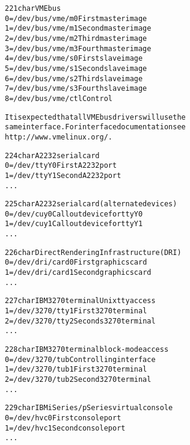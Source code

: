 \documentclass[a4paper,8pt,english]{sphinxmanual}
\begin{document}
\begin{alltt}
 221 char       VME bus
                  0 = /dev/bus/vme/m0           First master image
                  1 = /dev/bus/vme/m1           Second master image
                  2 = /dev/bus/vme/m2           Third master image
                  3 = /dev/bus/vme/m3           Fourth master image
                  4 = /dev/bus/vme/s0           First slave image
                  5 = /dev/bus/vme/s1           Second slave image
                  6 = /dev/bus/vme/s2           Third slave image
                  7 = /dev/bus/vme/s3           Fourth slave image
                  8 = /dev/bus/vme/ctl          Control

                It is expected that all VME bus drivers will use the
                same interface.  For interface documentation see
                http://www.vmelinux.org/.

 224 char       A2232 serial card
                  0 = /dev/ttyY0                First A2232 port
                  1 = /dev/ttyY1                Second A2232 port
                    ...

 225 char       A2232 serial card (alternate devices)
                  0 = /dev/cuy0                 Callout device for ttyY0
                  1 = /dev/cuy1                 Callout device for ttyY1
                    ...

 226 char       Direct Rendering Infrastructure (DRI)
                  0 = /dev/dri/card0            First graphics card
                  1 = /dev/dri/card1            Second graphics card
                    ...

 227 char       IBM 3270 terminal Unix tty access
                  1 = /dev/3270/tty1            First 3270 terminal
                  2 = /dev/3270/tty2            Seconds 3270 terminal
                    ...

 228 char       IBM 3270 terminal block-mode access
                  0 = /dev/3270/tub             Controlling interface
                  1 = /dev/3270/tub1            First 3270 terminal
                  2 = /dev/3270/tub2            Second 3270 terminal
                    ...

 229 char       IBM iSeries/pSeries virtual console
                  0 = /dev/hvc0                 First console port
                  1 = /dev/hvc1                 Second console port
                    ...


\end{alltt}
\end{document}
